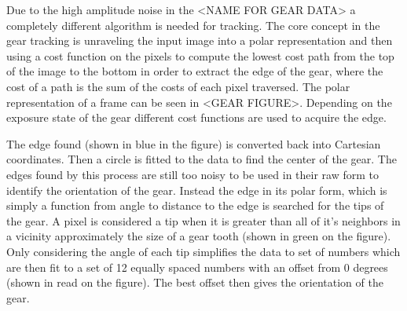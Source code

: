 \documentclass[11pt]{article}
\begin{document}
Due to the high amplitude noise in the <NAME FOR GEAR DATA> a
completely different algorithm is needed for tracking. The core
concept in the gear tracking is unraveling the input image into a
polar representation and then using a cost function on the pixels to
compute the lowest cost path from the top of the image to the bottom
in order to extract the edge of the gear, where the cost of a path is
the sum of the costs of each pixel traversed. The polar representation
of a frame can be seen in <GEAR FIGURE>. Depending on the exposure
state of the gear different cost functions are used to acquire the
edge.

The edge found (shown in blue in the figure) is converted back into
Cartesian coordinates. Then a circle is fitted to the data to find the
center of the gear. The edges found by this process are still too
noisy to be used in their raw form to identify the orientation of the
gear. Instead the edge in its polar form, which is simply a function
from angle to distance to the edge is searched for the tips of the
gear. A pixel is considered a tip when it is greater than all of it's
neighbors in a vicinity approximately the size of a gear tooth (shown
in green on the figure). Only considering the angle of each tip
simplifies the data to set of numbers which are then fit to a set of
12 equally spaced numbers with an offset from 0 degrees (shown in read
on the figure). The best offset then gives the orientation of the
gear.
\end{document}
